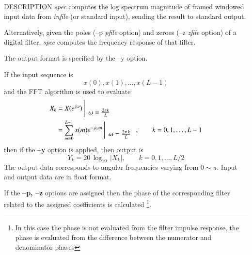 \begin{synopsis}
 \item[spec]   [ --l $L$ ] [ --m $M$ ] [ --n $N$ ] [ --z {\em zfile} ]
               [ --p {\em pfile} ]
 \item[\ ~~~~] [ --o $O$ ] [ {\em infile} ]
\end{synopsis}

\begin{qsection}{DESCRIPTION}
{\em spec} computes the log spectrum magnitude of framed windowed input data 
from {\em infile} (or standard input), 
sending the result to standard output.

Alternatively, given the poles (--p {\em pfile} option) 
and zeroes (--z {\em zfile} option) of a digital filter, 
{\em spec} computes the frequency response of that filter.

The output format is specified by the --y option.

If the input sequence is
\begin{displaymath}
  x(0), x(1), \dots, x(L-1)
\end{displaymath}
and the FFT algorithm is used to evaluate
\begin{align}
  X_k &= X(e^{j\omega}) \left|
	\begin{array}{c}
	\\
        \omega=\frac{2\pi k}{L}
	\end{array}
    \right. \notag \\
          &= \sum_{m=0}^{L-1}x(m)e^{-j\omega m} \left|
	\begin{array}{c}
	\\
        \omega=\frac{2\pi\, k}{L}
	\end{array}
    \right., \qquad k=0,1,\dots,L-1 \notag
\end{align}
then if the {\bf --y} option is applied, then
output is
\begin{displaymath}
  Y_k=20\,\log_{10}\,|X_k|,\qquad k=0,1,\dots,L/2
\end{displaymath}
The output data corresponds to angular frequencies varying from $0\sim \pi$.
Input and output data are in float format.
\par
If the {\bf --p, --z} options are assigned
then the phase of the corresponding filter related to
the assigned coefficients is calculated
\footnote{
In this case the phase is not evaluated from the filter
impulse response, the phase is evaluated from
the difference between the numerator and denominator phases}.
\end{qsection}

